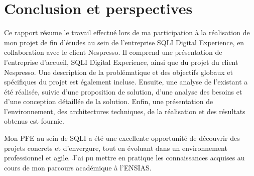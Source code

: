 \chapter*{Conclusion et perspectives}
\label{sec:conclusion}



Ce rapport résume le travail effectué lors de ma participation à la réalisation de mon projet de fin d'études au sein de l'entreprise SQLI Digital Experience, en collaboration avec le client Nespresso. Il comprend une présentation de l'entreprise d'accueil, SQLI Digital Experience, ainsi que du projet du client Nespresso. Une description de la problématique et des objectifs globaux et spécifiques du projet est également incluse. Ensuite, une analyse de l'existant a été réalisée, suivie d'une proposition de solution, d'une analyse des besoins et d'une conception détaillée de la solution. Enfin, une présentation de l'environnement, des architectures techniques, de la réalisation et des résultats obtenus est fournie. \par

Mon PFE au sein de SQLI a été une excellente opportunité de découvrir des projets concrets et d'envergure, tout en évoluant dans un environnement professionnel et agile. J'ai pu mettre en pratique les connaissances acquises au cours de mon parcours académique à l'ENSIAS. \par




